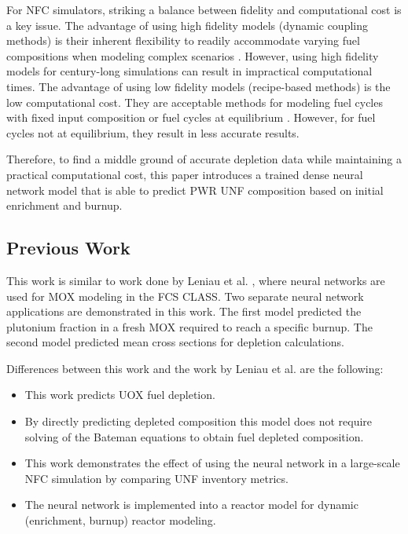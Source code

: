 For \gls{NFC} simulators, striking a balance between fidelity 
and computational cost is a key issue. 
The advantage of using high fidelity models (dynamic coupling 
methods) is their inherent flexibility 
to readily accommodate varying fuel compositions 
when modeling complex scenarios \cite{sunny_transition_2015}. 
However, using high fidelity models for century-long simulations 
can result in impractical computational times. 
The advantage of using low fidelity models (recipe-based methods)
is the low computational cost. 
They are acceptable methods for modeling fuel cycles with fixed input 
composition or fuel cycles at equilibrium \cite{sunny_transition_2015}. 
However, for fuel cycles not at equilibrium, they result in less 
accurate results. 

Therefore, to find a middle ground of accurate depletion data while 
maintaining a practical computational cost, this paper introduces 
a trained dense neural network model that is able to predict \gls{PWR} \gls{UNF}
composition based on initial enrichment and burnup. 

\subsection{Previous Work}
This work is similar to work done by Leniau et al. \cite{leniau_neural_2015},
where neural networks are used for \gls{MOX} modeling in the \gls{FCS} CLASS. Two separate neural network applications are
demonstrated in this work.
The first model predicted the plutonium fraction in a fresh \gls{MOX}
required to reach a specific burnup. The second model predicted
mean cross sections for depletion calculations.

Differences between this work and the work by Leniau et al. are
the following:
\begin{itemize}
    \item This work predicts \gls{UOX} fuel depletion.
    \item By directly predicting depleted composition this model does not require solving of the Bateman equations to obtain fuel depleted composition.
    \item This work demonstrates the effect of using the neural network in a large-scale \gls{NFC} simulation by comparing \gls{UNF} inventory metrics.
    \item The neural network is implemented into a reactor model for dynamic (enrichment, burnup) reactor modeling.
\end{itemize}






